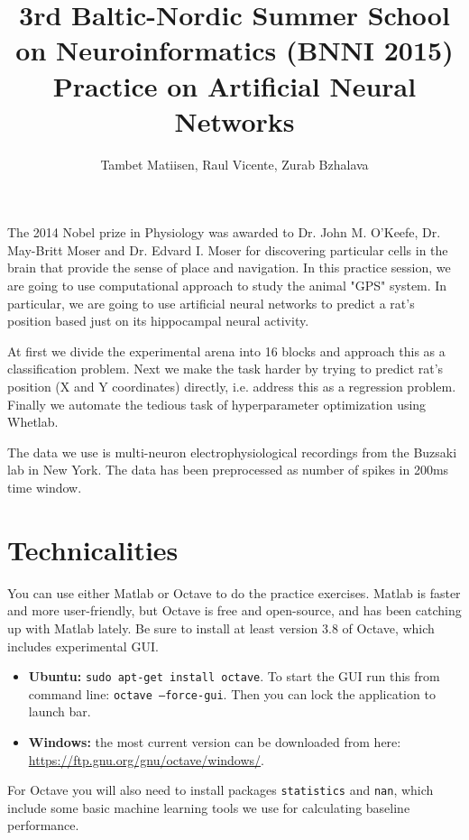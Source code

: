 \documentclass[a4paper,11pt]{article}
\author{\large{Tambet Matiisen, Raul Vicente, Zurab Bzhalava}}
\title{\huge{3rd Baltic-Nordic Summer School on Neuroinformatics (BNNI 2015)}\\\LARGE{Practice on Artificial Neural Networks}}
\begin{document}
\maketitle

%
%
The 2014 Nobel prize in Physiology was awarded to Dr. John M. O'Keefe, Dr. May-Britt Moser and Dr. Edvard I. Moser for discovering particular cells in the brain that provide the sense of place and navigation. In this practice session, we are going to use computational approach to study the animal "GPS" system. In particular, we are going to use artificial neural networks to predict a rat's position based just on its hippocampal neural activity.

At first we divide the experimental arena into 16 blocks and approach this as a classification problem. Next we make the task harder by trying to predict rat's position (X and Y coordinates) directly, i.e. address this as a regression problem. Finally we automate the tedious task of hyperparameter optimization using Whetlab. 

The data we use is multi-neuron electrophysiological recordings from the Buzsaki lab in New York. The data has been preprocessed as number of spikes in 200ms time window.

%
%
\section{Technicalities}

You can use either Matlab or Octave to do the practice exercises. Matlab is faster and more user-friendly, but Octave is free and open-source, and has been catching up with Matlab lately. Be sure to install at least version 3.8 of Octave, which includes experimental GUI.
\begin{itemize}
	\item \textbf{Ubuntu:} \texttt{sudo apt-get install octave}. To start the GUI run this from command line: \texttt{octave --force-gui}. Then you can lock the application to launch bar. 
	\item \textbf{Windows:} the most current version can be downloaded from here:\\ \url{https://ftp.gnu.org/gnu/octave/windows/}.
\end{itemize}

For Octave you will also need to install packages \texttt{statistics} and \texttt{nan}, which include some basic machine learning tools we use for calculating baseline performance. 
\end{document}
